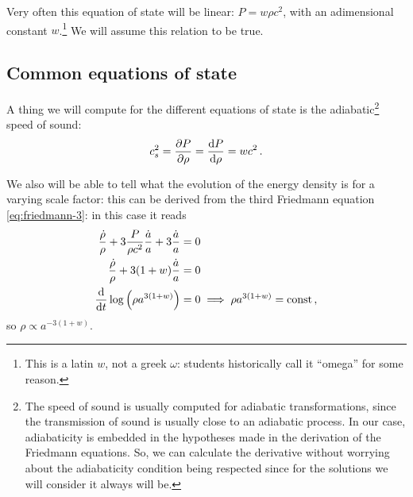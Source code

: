 \documentclass[main.tex]{subfiles}
\begin{document}
Very often this equation of state will be linear: \(P = w \rho c^2\), with an adimensional constant \(w\).\footnote{This is a latin \(w\), not a greek \(\omega \): students historically call it ``omega'' for some reason.}
We will assume this relation to be true.



\subsection{Common equations of state}

A thing we will compute for the different equations of state is the adiabatic\footnote{The speed of sound is usually computed for adiabatic transformations, since the transmission of sound is usually close to an adiabatic process. In our case, adiabaticity is embedded in the hypotheses made in the derivation of the Friedmann equations. So, we can calculate the derivative without worrying about the adiabaticity condition being respected since for the solutions we will consider it always will be.} speed of sound: 
%
\begin{align}
c^2_{s} = \pdv{P}{\rho } = \dv{P}{\rho } = w c^2
\,.
\end{align}

We also will be able to tell what the evolution of the energy density is for a varying scale factor:
this can be derived from the third Friedmann equation \eqref{eq:friedmann-3}: in this case it reads 
%
\begin{align}
\frac{\dot{\rho}}{\rho } + 3\frac{P}{\rho c^2} \frac{\dot{a}}{a} + 3 \frac{\dot{a}}{a}  &= 0   \\
\frac{\dot{\rho}}{\rho } + 3 (1+w) \frac{\dot{a}}{a} &= 0 \\
\dv{}{t} \log \qty(\rho a^{3(1+w)}) &=0 \implies \rho a^{3(1+w)} = \text{const}
\,,
\end{align}
%
so \(\rho \propto a^{-3(1+w)}\).
\end{document}
